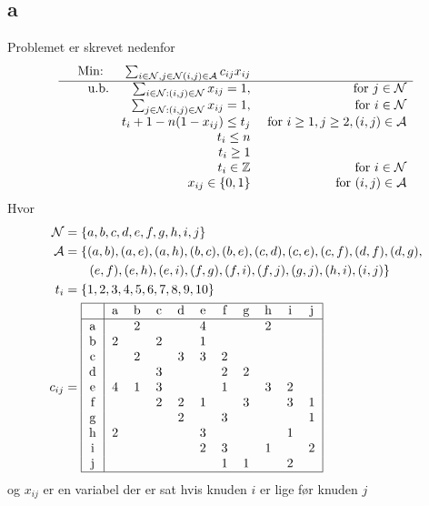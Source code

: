 \documentclass[a4paper]{article}
\begin{document}
\subsection*{a}
Problemet er skrevet nedenfor
\begin{equation}
\begin{array}{rrrrl}
&\text{Min: } &\sum_{i\in \mathcal{N},j\in \mathcal{N}(i,j)\in \mathcal{A}}c_{ij}x_{ij} &\\
\hline
&\text{u.b.} &\sum_{i\in \mathcal{N}:(i,j)\in \mathcal{N}}x_{ij}=1,&\text{ for }j\in \mathcal{N} \\
& &\sum_{j\in \mathcal{N}:(i,j)\in \mathcal{N}}x_{ij}=1,&\text{ for }i\in \mathcal{N} \\
& &t_i+1-n(1-x_{ij}) \leq t_j &\text{ for }i\geq 1,j\geq 2,(i,j)\in \mathcal{A} \\
& &t_i\leq n & \\
& &t_i\geq 1 & \\
& &t_i\in \mathbb{Z}&\text{ for }i\in \mathcal{N} \\
& &x_{ij}\in \{0,1\}&\text{ for }(i,j)\in \mathcal{A} \\
\end{array}
\end{equation}
Hvor
\begin{align*}
\mathcal{N}&=\{a,b,c,d,e,f,g,h,i,j\} \\
\mathcal{A}&=\{(a,b),(a,e),(a,h),(b,c),(b,e),(c,d),(c,e),(c,f),(d,f),(d,g),\\
&\:\:\:\:\:\:\:\:\:(e,f),(e,h),(e,i),(f,g),(f,i),(f,j),(g,j),(h,i),(i,j)\} \\
t_i&=\{1,2,3,4,5,6,7,8,9,10\} \\
c_{ij}&=
\begin{tabular}{|c|cccccccccc|}
\hline 
  & a & b & c & d & e & f & g & h & i & j \\ 
\hline 
a &   & 2 &   &   & 4 &   &   & 2 &   &   \\ 
b & 2 &   & 2 &   & 1 &   &   &   &   &   \\ 
c &   & 2 &   & 3 & 3 & 2 &   &   &   &   \\ 
d &   &   & 3 &   &   & 2 & 2 &   &   &   \\ 
e & 4 & 1 & 3 &   &   & 1 &   & 3 & 2 &   \\ 
f &   &   & 2 & 2 & 1 &   & 3 &   & 3 & 1 \\ 
g &   &   &   & 2 &   & 3 &   &   &   & 1 \\ 
h & 2 &   &   &   & 3 &   &   &   & 1 &   \\ 
i &   &   &   &   & 2 & 3 &   & 1 &   & 2 \\ 
j &   &   &   &   &   & 1 & 1 &   & 2 &   \\ 
\hline
\end{tabular} 
\end{align*}
og $x_{ij}$ er en variabel der er sat hvis knuden $i$ er lige før knuden $j$
\end{document}

